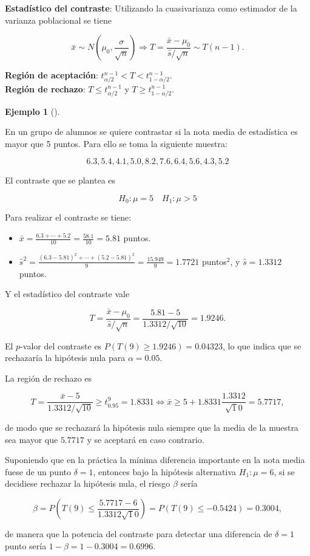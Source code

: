 \documentclass[
  spanish,
  a4paper,
]{scrreport}
\providecommand{\tightlist}{%
  \setlength{\itemsep}{0pt}\setlength{\parskip}{0pt}}
\theoremstyle{plain}
\theoremstyle{definition}
\newtheorem{example}{Ejemplo}[chapter]
\theoremstyle{definition}
\theoremstyle{remark}
\begin{document}
\textbf{Estadístico del contraste}: Utilizando la cuasivarianza como
estimador de la varianza poblacional se tiene

\[
\bar x\sim N\left(\mu_0,\frac{\sigma}{\sqrt{n}}\right) \Rightarrow T=\frac{\bar x-\mu_0}{\hat s/\sqrt{n}}\sim T(n-1).
\]

\textbf{Región de aceptación}:
\(t^{n-1}_{\alpha/2} < T < t^{n-1}_{1-\alpha/2}\).\\
\textbf{Región de rechazo}: \(T\leq t^{n-1}_{\alpha/2}\) y
\(T\geq t^{n-1}_{1-\alpha/2}\).

\begin{example}[]\protect\hypertarget{exm-contraste-media-normal-varianza-desconocida}{}\label{exm-contraste-media-normal-varianza-desconocida}

En un grupo de alumnos se quiere contrastar si la nota media de
estadística es mayor que 5 puntos. Para ello se toma la siguiente
muestra:

\[
6.3, 5.4, 4.1, 5.0, 8.2, 7.6, 6.4, 5.6, 4.3, 5.2
\]

El contraste que se plantea es

\[H_0: \mu=5 \quad H_1: \mu>5\]

Para realizar el contraste se tiene:

\begin{itemize}
\tightlist
\item
  \(\bar x = \frac{6.3+\cdots+5.2}{10}=\frac{58.1}{10}=5.81\) puntos.
\item
  \(\hat s^2 = \frac{(6.3-5.81)^2+\cdots+(5.2-5.81)^2}{9} = \frac{15.949}{9}=1.7721\)
  puntos\(^2\), y \(\hat s=1.3312\) puntos.
\end{itemize}

Y el estadístico del contraste vale

\[
T=\frac{\bar x-\mu_0}{\hat s/\sqrt{n}} = \frac{5.81-5}{1.3312/\sqrt{10}}= 1.9246.
\]

El \(p\)-valor del contraste es \(P(T(9)\geq 1.9246) = 0.04323\), lo que
indica que se rechazaría la hipótesis nula para \(\alpha=0.05\).

La región de rechazo es

\[
T=\frac{\bar x-5}{1.3312/\sqrt{10}} \geq t^9_{0.95} = 1.8331 \Leftrightarrow \bar x \geq 5+1.8331\frac{1.3312}{\sqrt
10} = 5.7717,
\]

de modo que se rechazará la hipótesis nula siempre que la media de la
muestra sea mayor que \(5.7717\) y se aceptará en caso contrario.

Suponiendo que en la práctica la mínima diferencia importante en la nota
media fuese de un punto \(\delta=1\), entonces bajo la hipótesis
alternativa \(H_1:\mu=6\), si se decidiese rechazar la hipótesis nula,
el riesgo \(\beta\) sería

\[
\beta = P\left(T(9)\leq \frac{5.7717-6}{1.3312\sqrt 10}\right) = P(T(9)\leq -0.5424) = 0.3004,
\]

de manera que la potencia del contraste para detectar una diferencia de
\(\delta=1\) punto sería \(1-\beta=1-0.3004 = 0.6996\).

\end{example}
\end{document}
